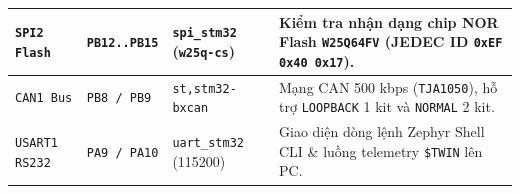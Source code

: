 \begin{xltabular}{\textwidth}{|L{2.6cm}|L{2.8cm}|L{3.0cm}|Y|}
\hline
\texttt{SPI2 Flash} & \texttt{PB12..PB15} & \texttt{spi\_stm32} (\texttt{w25q-cs}) & Kiểm tra nhận dạng chip NOR Flash \texttt{W25Q64FV} (JEDEC ID \texttt{0xEF 0x40 0x17}). \\
\hline
{}
\texttt{CAN1 Bus} & \texttt{PB8 / PB9} & \texttt{st,stm32-bxcan} & Mạng CAN 500 kbps (\texttt{TJA1050}), hỗ trợ \texttt{LOOPBACK} 1 kit và \texttt{NORMAL} 2 kit. \\
\hline
\texttt{USART1 RS232} & \texttt{PA9 / PA10} & \texttt{uart\_stm32} (115200) & Giao diện dòng lệnh Zephyr Shell CLI \& luồng telemetry \texttt{\$TWIN} lên PC. \\
\hline
\end{xltabular}
\endgroup
